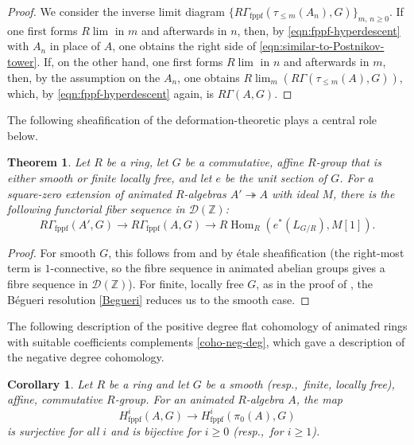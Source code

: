 \documentclass[11pt, reqno]{amsart}
\DeclareMathOperator{\Hom}{Hom}		%
\newcommand{\fppf}{\mathrm{fppf}}		%
\newcommand{\ra}{\rightarrow}
\newcommand{\surjects}{\twoheadrightarrow}
\providecommand{\up}[1]{{\upshape(}#1{\upshape)}}
\providecommand{\ucolon}{{\upshape:} }
\newcommand{\tst}{\textstyle}
\newcommand{\bpf}{\begin{proof}}
\newcommand{\epf}{\end{proof}}
\newcommand{\bthm}{\begin{thm}}
\newcommand{\ethm}{\end{thm}}
\newcommand{\bcor}{\begin{cor}}
\newcommand{\ecor}{\end{cor}}
\numberwithin{equation}{numberingbase}
\theoremstyle{thms}
\newtheorem{cor}[numberingbase]{Corollary}
\newtheorem{thm}[numberingbase]{Theorem}
\theoremstyle{claims}
\theoremstyle{defs}
\theoremstyle{thms}
\theoremstyle{defs}
\theoremstyle{subsection-tweak}
\theoremstyle{subsection-tweak}
\begin{document}
\bpf
We consider the inverse limit diagram $\{ R\Gamma_\fppf(\tau_{\le m}(A_n), G) \}_{m,\, n \ge 0}$. If one first forms $R\lim$ in $m$ and afterwards in $n$, then, by \eqref{eqn:fppf-hyperdescent} with $A_n$ in place of $A$, one obtains the right side of \eqref{eqn:similar-to-Postnikov-tower}. If, on the other hand, one first forms $R\lim$ in $n$ and afterwards in $m$, then, by the assumption on the $A_n$, one obtains $R\lim_m(R\Gamma(\tau_{\le m}(A), G))$, which, by \eqref{eqn:fppf-hyperdescent} again, is $R\Gamma(A, G)$. 
\epf



The following sheafification of the deformation-theoretic  plays a central role below.

\bthm \label{prop:defthy}
Let $R$ be a ring, let $G$ be a commutative, affine $R$-group that is either smooth or finite locally free, and let $e$ be the unit section of $G$. For a square-zero extension of animated $R$-algebras $A'\surjects A$ with ideal $M$, there is the following functorial fiber sequence in $\mathcal D(\mathbb Z)$\ucolon
\[
R\Gamma_\fppf(A',G)\to R\Gamma_\fppf(A,G)\to R\Hom_R(e^*(L_{G/R}), M[1]).
\]
\ethm

\begin{proof} 
For smooth $G$, this follows from  and  by \'etale sheafification (the right-most term is $1$-connective, so the fibre sequence in animated abelian groups gives a fibre sequence in $\mathcal D(\mathbb Z)$). For finite, locally free $G$, as in the proof of , the B\'{e}gueri resolution \eqref{Begueri}
reduces us to the smooth case.
\end{proof}



The following description of the positive degree flat cohomology of animated rings with suitable coefficients complements \eqref{coho-neg-deg}, which gave a description of the negative degree cohomology.


\bcor \label{cor:nil-nil-deform-cohomology}
Let $R$ be a ring and let $G$ be a smooth \up{resp.,~finite, locally free}, affine, commutative $R$-group. For an animated $R$-algebra $A$, the map
\[
\tst H^i_\fppf(A,G) \ra H^i_\fppf(\pi_0(A),G)  
\]
is surjective for all $i$ and is bijective for $i\ge 0$ \up{resp.,~for $i \ge 1$}.
\ecor
\end{document}
